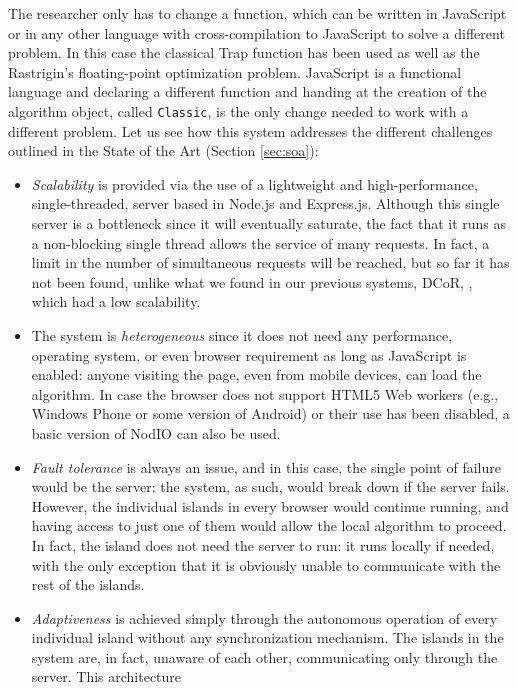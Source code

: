 \documentclass[letterpaper]{article}
\begin{document}
The researcher only has to change a function, which can be written in
JavaScript or in any other language with cross-compilation to
JavaScript \citep{web:compilersjs} to solve a different
problem. In this case the classical Trap function \citep{Ackley1987} has been
used as well as the Rastrigin's floating-point optimization
problem. JavaScript is a functional language and declaring a different 
function and handing at the creation of the algorithm object, called
{\tt Classic}, is the only change needed to work with a different
problem. Let us see how this system addresses the different challenges
outlined in the State of the Art (Section \ref{sec:soa}):
\begin{itemize}
\item {\em Scalability} is provided via the use of a lightweight and
  high-performance, single-threaded, server based in Node.js and
  Express.js. Although this single server is a bottleneck since it
  will eventually saturate, the fact that it runs as a non-blocking single thread
  allows the service of many requests. In fact, a limit in the
  number of simultaneous requests will be reached, but so far it has
  not been found, unlike what we found in our previous systems, DCoR,
  \citep{gecco07:workshop:dcor}, which had a low scalability. 
\item The system is {\em heterogeneous} since it does not need any
  performance, operating system, or even browser requirement as long
  as JavaScript is enabled: anyone
  visiting the page, even from mobile devices, can load the algorithm.
  In case the browser does not support HTML5 Web workers (e.g., 
  Windows Phone or some version of Android) or their use
  has been disabled, a basic version of {\sf NodIO} can also be used.
\item {\em Fault tolerance} is always an issue, and in this case, the
  single point of failure would be the server: the system, as such,
  would break down if the server fails. However, the individual
  islands in every browser would continue running, and having access
  to just one of them would allow the local algorithm to proceed. In
  fact, the island does not need the server to run: it runs locally if
  needed, with the only exception that it is obviously unable to
  communicate with the rest of the islands.
\item {\em Adaptiveness} is achieved simply through the autonomous
  operation of every individual island without any synchronization
  mechanism. The islands in the system are, in fact, unaware of each
  other, communicating only through the server. This architecture 

\end{itemize}
\end{document}
